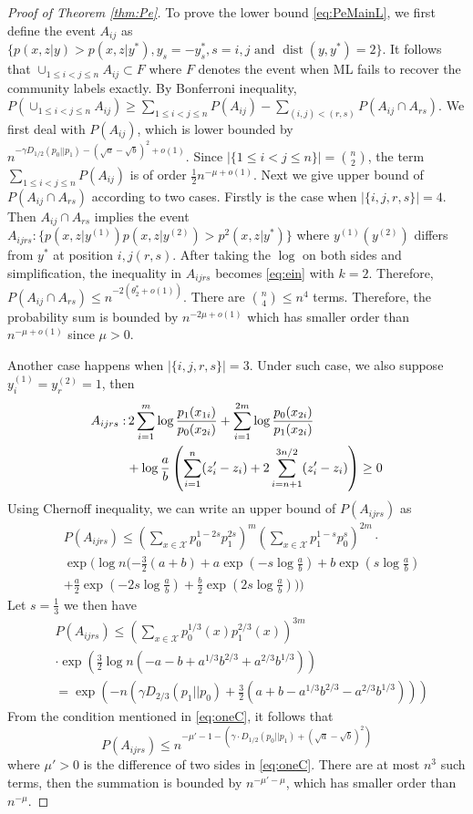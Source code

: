 \documentclass[conference]{IEEEtran}
\DeclareMathOperator{\dist}{dist}
\begin{document}
\begin{proof}[Proof of Theorem \ref{thm:Pe}]
To prove the lower bound \ref{eq:PeMainL}, we first
define the event $A_{ij}$ as $\{p(x,z|y) > p(x,z|y^*),y_s=-y^*_s, s=i,j \textrm{ and } \dist(y,y^*)=2  \}$.
It follows that $\cup_{1\leq i < j\leq n} A_{ij} \subset F$ where $F$ denotes the event when ML fails to recover the community labels exactly.
By Bonferroni inequality,
$P(\cup_{1\leq i < j\leq n} A_{ij}) \geq \sum_{1\leq i < j\leq n} P(A_{ij}) - \sum_{(i,j) < (r,s) } P(A_{ij} \cap A_{rs})$.
We first deal with $P(A_{ij})$, which is lower bounded by $n^{-\gamma D_{1/2}(p_0 || p_1)-(\sqrt{a} - \sqrt{b})^2 +o(1)}$. Since $|\{1\leq i < j\leq n\}|=\binom{n}{2}$, the term $\sum_{1\leq i < j\leq n} P(A_{ij})$ is of order $\frac{1}{2}n^{-\mu+o(1)}$.
Next we give upper bound of $P(A_{ij} \cap A_{rs})$ according to two cases.
Firstly is the case when $|\{i,j,r,s\}|=4$. Then $A_{ij} \cap A_{rs}$ implies the event
$A_{ijrs}: \{p(x,z|y^{(1)})p(x,z|y^{(2)}) > p^2(x,z|y^*)\}$ where $y^{(1)}(y^{(2)})$ differs from $y^*$ at position $i,j(r,s)$.
After taking the $\log$ on both sides and simplification, the inequality in $A_{ijrs}$ becomes \eqref{eq:ein}  with $k=2$.
Therefore, $P(A_{ij} \cap A_{rs}) \leq n^{-2(\theta^*_2 + o(1))} $. There are
$\binom{n}{4} \leq n^4$ terms. Therefore, the probability sum
is bounded by $n^{-2\mu +o(1)}$ which has smaller order than $n^{-\mu+o(1)}$ since $\mu > 0$.

Another case happens when $|\{i,j,r,s\}|=3$. Under such case, we also suppose $y^{(1)}_i = y^{(2)}_r = 1$, then
\begin{align}
A_{ijrs}: &\, 2\sum_{i=1}^m  \log \frac{p_1(x_{1i})}{p_0(x_{2i})}
+ \sum_{i=1}^{2m} \log \frac{p_0(x_{2i})}{p_1(x_{2i})} \\
& +\log\frac{a}{b}\left(
\sum_{i=1}^{n} (z'_i - z_i) + 2\sum_{i=n+1}^{3n/2} (z'_i - z_i)\right)  \geq 0\notag
\end{align}
Using Chernoff inequality, we can write an upper bound of $P(A_{ijrs})$ as
\begin{align*}
&P(A_{ijrs}) \leq  (\sum_{x\in \mathcal{X}} p_0^{1-2s}p_1^{2s})^m (\sum_{x\in \mathcal{X}} p_1^{1-s}p_0^{s})^{2m} \cdot \\
&\exp(\log n (-\frac{3}{2}(a+b)+a\exp(-s\log \frac{a}{b})+b\exp(s\log \frac{a}{b}) \\
&+ \frac{a}{2}\exp(-2s\log \frac{a}{b})+\frac{b}{2}\exp(2s\log \frac{a}{b})))
\end{align*}
Let $s=\frac{1}{3}$ we then have
\begin{align*}
&P(A_{ijrs})\leq  (\sum_{x\in \mathcal{X}} p_0^{1/3}(x)p_1^{2/3}(x))^{3m}\\
& \cdot \exp(\frac{3}{2}\log n (-a-b+a^{1/3}b^{2/3}+a^{2/3}b^{1/3})) \\
&=  \exp(-n(\gamma D_{2/3}(p_1 || p_0) + \frac{3}{2} (a+b-a^{1/3}b^{2/3}-a^{2/3}b^{1/3})))
\end{align*}
From the condition mentioned in \eqref{eq:oneC},
it follows that
$$
P(A_{ijrs}) \leq n^{-\mu'-1-(\gamma \cdot D_{1/2}(p_0||p_1) + (\sqrt{a} - \sqrt{b})^2)}
$$
where $\mu'>0$ is the difference of two sides in \eqref{eq:oneC}. 
There are at most $n^3$ such terms, then the summation is bounded by
$n^{-\mu'-\mu }$,
which has smaller order than $n^{-\mu}$.


\end{proof}
\end{document}
